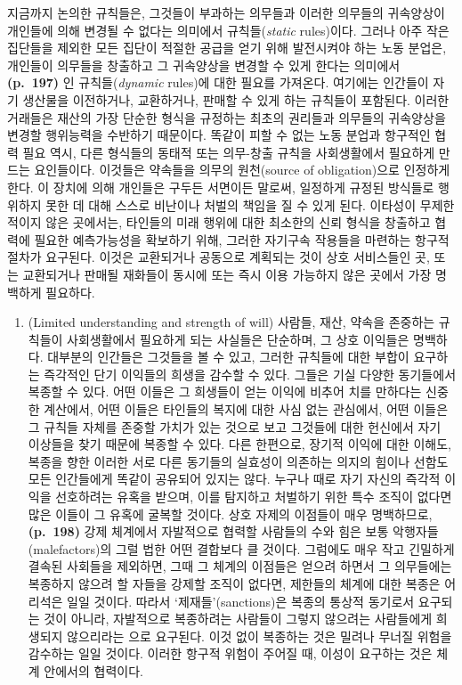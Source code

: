 지금까지 논의한 규칙들은, 그것들이 부과하는 의무들과 이러한 의무들의
귀속양상이 개인들에 의해 변경될 수 없다는 의미에서 
규칙들(\emph{static} rules)이다. 그러나 아주 작은 집단들을 제외한 모든
집단이 적절한 공급을 얻기 위해 발전시켜야 하는 노동 분업은, 개인들이
의무들을 창출하고 그 귀속양상을 변경할 수 있게 한다는 의미에서
\textbf{(p.~197)} 인 규칙들(\emph{dynamic} rules)에 대한
필요를 가져온다. 여기에는 인간들이 자기 생산물을 이전하거나, 교환하거나,
판매할 수 있게 하는 규칙들이 포함된다. 이러한 거래들은 재산의 가장
단순한 형식을 규정하는 최초의 권리들과 의무들의 귀속양상을 변경할
행위능력을 수반하기 때문이다. 똑같이 피할 수 없는 노동 분업과 항구적인
협력 필요 역시, 다른 형식들의 동태적 또는 의무-창출 규칙을 사회생활에서
필요하게 만드는 요인들이다. 이것들은 약속들을 의무의 원천(source of
obligation)으로 인정하게 한다. 이 장치에 의해 개인들은 구두든 서면이든
말로써, 일정하게 규정된 방식들로 행위하지 못한 데 대해 스스로 비난이나
처벌의 책임을 질 수 있게 된다. 이타성이 무제한적이지 않은 곳에서는,
타인들의 미래 행위에 대한 최소한의 신뢰 형식을 창출하고 협력에 필요한
예측가능성을 확보하기 위해, 그러한 자기구속 작용들을 마련하는 항구적
절차가 요구된다. 이것은 교환되거나 공동으로 계획되는 것이 상호
서비스들인 곳, 또는 교환되거나 판매될 재화들이 동시에 또는 즉시 이용
가능하지 않은 곳에서 가장 명백하게 필요하다.

\begin{enumerate}
\def\labelenumi{(\alph{enumi})}
\setcounter{enumi}{21}
\tightlist
\item
   (Limited understanding and strength of
  will) 사람들, 재산, 약속을 존중하는 규칙들이 사회생활에서 필요하게
  되는 사실들은 단순하며, 그 상호 이익들은 명백하다. 대부분의 인간들은
  그것들을 볼 수 있고, 그러한 규칙들에 대한 부합이 요구하는 즉각적인
  단기 이익들의 희생을 감수할 수 있다. 그들은 기실 다양한 동기들에서
  복종할 수 있다. 어떤 이들은 그 희생들이 얻는 이익에 비추어 치를
  만하다는 신중한 계산에서, 어떤 이들은 타인들의 복지에 대한 사심 없는
  관심에서, 어떤 이들은 그 규칙들 자체를 존중할 가치가 있는 것으로 보고
  그것들에 대한 헌신에서 자기 이상들을 찾기 때문에 복종할 수 있다. 다른
  한편으로, 장기적 이익에 대한 이해도, 복종을 향한 이러한 서로 다른
  동기들의 실효성이 의존하는 의지의 힘이나 선함도 모든 인간들에게 똑같이
  공유되어 있지는 않다. 누구나 때로 자기 자신의 즉각적 이익을 선호하려는
  유혹을 받으며, 이를 탐지하고 처벌하기 위한 특수 조직이 없다면 많은
  이들이 그 유혹에 굴복할 것이다. 상호 자제의 이점들이 매우 명백하므로,
  \textbf{(p.~198)} 강제 체계에서 자발적으로 협력할 사람들의 수와 힘은
  보통 악행자들(malefactors)의 그럴 법한 어떤 결합보다 클 것이다.
  그럼에도 매우 작고 긴밀하게 결속된 사회들을 제외하면, 그때 그 체계의
  이점들은 얻으려 하면서 그 의무들에는 복종하지 않으려 할 자들을 강제할
  조직이 없다면, 제한들의 체계에 대한 복종은 어리석은 일일 것이다.
  따라서 ‘제재들’(sanctions)은 복종의 통상적 동기로서 요구되는 것이
  아니라, 자발적으로 복종하려는 사람들이 그렇지 않으려는 사람들에게
  희생되지 않으리라는 으로 요구된다. 이것 없이
  복종하는 것은 밀려나 무너질 위험을 감수하는 일일 것이다. 이러한 항구적
  위험이 주어질 때, 이성이 요구하는 것은  체계 안에서의
   협력이다.
\end{enumerate}

